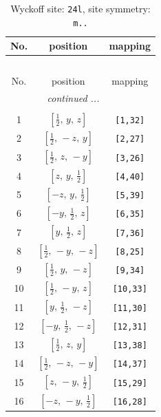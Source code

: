 \documentclass[fleqn,8pt]{jsarticle}
\begin{document}
\renewcommand{\arraystretch}{1.2}
\begin{longtable}{ccc}
\caption{Wyckoff site: {\tt 24l}, site symmetry: {\tt m..}}
 \\
 \hline \hline
No. & position & mapping \\ \hline \endfirsthead

\multicolumn{2}{l}{\tablename\ \thetable{}} \\
 \hline \hline
No. & position & mapping \\ \hline \endhead

 \hline \hline
\multicolumn{2}{r}{\footnotesize\it continued ...} \\ \endfoot

 \hline \hline
\multicolumn{2}{r}{} \\ \endlastfoot

1 & $\left[ \frac{1}{2},\, y,\, z \right]$ & {\tt [1,32]} \\ \hline
2 & $\left[ \frac{1}{2},\, - z,\, y \right]$ & {\tt [2,27]} \\ \hline
3 & $\left[ \frac{1}{2},\, z,\, - y \right]$ & {\tt [3,26]} \\ \hline
4 & $\left[ z,\, y,\, \frac{1}{2} \right]$ & {\tt [4,40]} \\ \hline
5 & $\left[ - z,\, y,\, \frac{1}{2} \right]$ & {\tt [5,39]} \\ \hline
6 & $\left[ - y,\, \frac{1}{2},\, z \right]$ & {\tt [6,35]} \\ \hline
7 & $\left[ y,\, \frac{1}{2},\, z \right]$ & {\tt [7,36]} \\ \hline
8 & $\left[ \frac{1}{2},\, - y,\, - z \right]$ & {\tt [8,25]} \\ \hline
9 & $\left[ \frac{1}{2},\, y,\, - z \right]$ & {\tt [9,34]} \\ \hline
10 & $\left[ \frac{1}{2},\, - y,\, z \right]$ & {\tt [10,33]} \\ \hline
11 & $\left[ y,\, \frac{1}{2},\, - z \right]$ & {\tt [11,30]} \\ \hline
12 & $\left[ - y,\, \frac{1}{2},\, - z \right]$ & {\tt [12,31]} \\ \hline
13 & $\left[ \frac{1}{2},\, z,\, y \right]$ & {\tt [13,38]} \\ \hline
14 & $\left[ \frac{1}{2},\, - z,\, - y \right]$ & {\tt [14,37]} \\ \hline
15 & $\left[ z,\, - y,\, \frac{1}{2} \right]$ & {\tt [15,29]} \\ \hline
16 & $\left[ - z,\, - y,\, \frac{1}{2} \right]$ & {\tt [16,28]} \\ \hline

\end{longtable}
\end{document}
